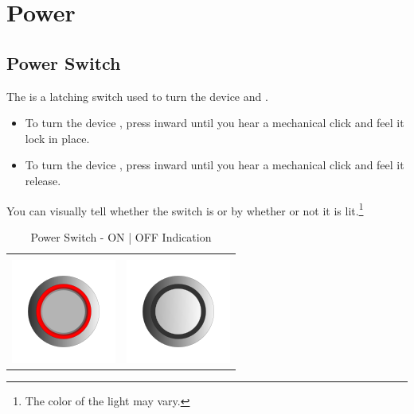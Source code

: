 \section{Power}

\subsection{Power Switch} \label{Power Switch}

The  is a latching switch used to turn the device  and .
\begin{itemize}
  \item To turn the device , press inward until you hear a mechanical
    click and feel it lock in place.
  \item To turn the device , press inward until you hear a mechanical
    click and feel it release.
\end{itemize}

You can visually tell whether the switch is  or  by whether or
not it is lit.\footnote{ The color of the light may vary.}

\begin{table}[H]
\centering
\begin{tabu} to 7cm { X[1,c,m] X[1,c,m] }
   &  \\
  \includegraphics{images/onoff_on.png} & \includegraphics{images/onoff_off.png} \\
\end{tabu}
\caption{Power Switch - ON | OFF Indication}
\end{table}

